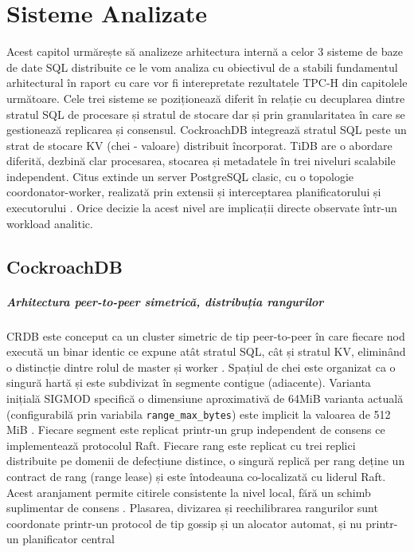 \chapter{Sisteme Analizate}

Acest capitol urmărește să analizeze arhitectura internă a celor 3 sisteme de baze de date SQL distribuite ce le vom analiza cu obiectivul de a stabili fundamentul arhitectural în raport cu care vor fi interepretate rezultatele TPC-H din capitolele următoare. Cele trei sisteme se poziționează diferit în relație cu decuplarea dintre stratul SQL de procesare și stratul de stocare dar și prin granularitatea în care se gestionează replicarea și consensul. CockroachDB integrează stratul SQL peste un strat de stocare KV (chei - valoare) distribuit încorporat. TiDB are o abordare diferită, dezbină clar procesarea, stocarea și metadatele în trei niveluri scalabile independent. Citus extinde un server PostgreSQL clasic, cu o topologie coordonator-worker, realizată prin extensii și interceptarea planificatorului și executorului \cite{taftcrdb2020,huangtidb2020,cubukcucitus2021}. Orice decizie la acest nivel are implicații directe observate într-un workload analitic.

\section{CockroachDB}

\paragraph{Arhitectura peer-to-peer simetrică, distribuția rangurilor}

CRDB este conceput ca un cluster simetric de tip peer-to-peer în care fiecare nod execută un binar identic ce expune atât stratul SQL, cât și stratul KV, eliminând o distincție dintre rolul de master și worker \cite{taftcrdb2020, crdb_arch_overview}. Spațiul de chei este organizat ca o singură hartă și este subdivizat în segmente contigue (adiacente). Varianta inițială SIGMOD specifică o dimensiune aproximativă de 64MiB varianta actuală (configurabilă prin variabila \texttt{range\_max\_bytes}) este implicit la valoarea de 512 MiB \cite{taftcrdb2020, crdb_arch_overview}. Fiecare segment este replicat printr-un grup independent de consens ce implementează protocolul Raft. Fiecare rang este replicat cu trei replici distribuite pe domenii de defecțiune distince, o singură replică per rang deține un contract de rang (range lease) și este întodeauna co-localizată cu liderul Raft. Acest aranjament permite citirele consistente la nivel local, fără un schimb suplimentar de consens \cite{crdb_arch_overview}. Plasarea, divizarea și reechilibrarea rangurilor sunt coordonate printr-un protocol de tip gossip și un alocator automat, și nu printr-un planificator central

